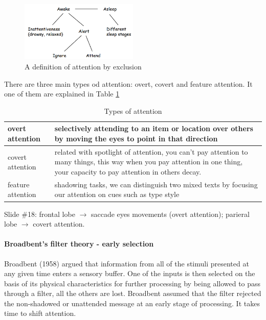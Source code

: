 \documentclass[12pt,article,oneside,a4paper]{memoir}
\begin{document}
\begin{figure}[h]
  \centering
  \includegraphics[width=0.5\textwidth]{imgs/attention.png}
  \caption{A definition of attention by exclusion}
  \label{fig:attention}
\end{figure}

There are three main types od attention: overt, covert and feature attention. It one of them are explained in Table \ref{table:types-attention}

\begin{table}
  \begin{tabular}{ p{5cm} |  p{10cm} }
    \hline
    overt attention & selectively attending to an item or location over others by moving the eyes to point in that direction \\ \hline
    covert attention & related with spotlight of attention, you can't pay attention to many things, this way when you pay attention in one thing, your capacity to pay attention in others decay. \\ \hline
    feature attention & shadowing tasks, we can distinguish two mixed texts by focusing our attention on cues such as type style \\ 
    \hline
  \end{tabular}
  \caption{Types of attention}
  \label{table:types-attention}
\end{table}

Slide \#18: frontal lobe $\rightarrow$ saccade eyes movements (overt attention); parieral lobe $\rightarrow$ covert attention.

\paragraph{Broadbent's filter theory - early selection} Broadbent (1958) argued that information from all of the stimuli presented at any given time enters a sensory buffer.  One of the inputs is then selected on the basis of its physical characteristics for further processing by being allowed to pass through a filter, all the others are lost.  Broadbent assumed that the filter rejected the non-shadowed or unattended message at an early stage of processing. It takes time to shift attention.
\end{document}

